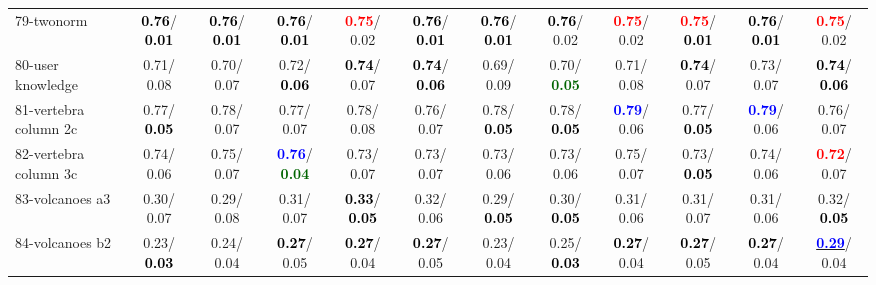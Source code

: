 \begin{table}[h]
\begin{center}
{\begin{tabular}{lc|c|c|c|c|c|c|c|c|c|c}
79-twonorm & \textcolor{black}{\textbf{  0.76}}/\textcolor{black}{\textbf{  0.01}} & \textcolor{black}{\textbf{  0.76}}/\textcolor{black}{\textbf{  0.01}} & \textcolor{black}{\textbf{  0.76}}/\textcolor{black}{\textbf{  0.01}} & \textcolor{red}{\textbf{  0.75}}/  0.02 & \textcolor{black}{\textbf{  0.76}}/\textcolor{black}{\textbf{  0.01}} & \textcolor{black}{\textbf{  0.76}}/\textcolor{black}{\textbf{  0.01}} & \textcolor{black}{\textbf{  0.76}}/  0.02 & \textcolor{red}{\textbf{  0.75}}/  0.02 & \textcolor{red}{\textbf{  0.75}}/\textcolor{black}{\textbf{  0.01}} & \textcolor{black}{\textbf{  0.76}}/\textcolor{black}{\textbf{  0.01}} & \textcolor{red}{\textbf{  0.75}}/  0.02 \\
80-user knowledge &   0.71/  0.08 &   0.70/  0.07 &   0.72/\textcolor{black}{\textbf{  0.06}} & \textcolor{black}{\textbf{  0.74}}/  0.07 & \textcolor{black}{\textbf{  0.74}}/\textcolor{black}{\textbf{  0.06}} &   0.69/  0.09 &   0.70/\textcolor{darkgreen}{\textbf{  0.05}} &   0.71/  0.08 & \textcolor{black}{\textbf{  0.74}}/  0.07 &   0.73/  0.07 & \textcolor{black}{\textbf{  0.74}}/\textcolor{black}{\textbf{  0.06}} \\
81-vertebra column 2c &   0.77/\textcolor{black}{\textbf{  0.05}} &   0.78/  0.07 &   0.77/  0.07 &   0.78/  0.08 &   0.76/  0.07 &   0.78/\textcolor{black}{\textbf{  0.05}} &   0.78/\textcolor{black}{\textbf{  0.05}} & \textcolor{blue}{\textbf{  0.79}}/  0.06 &   0.77/\textcolor{black}{\textbf{  0.05}} & \textcolor{blue}{\textbf{  0.79}}/  0.06 &   0.76/  0.07 \\
82-vertebra column 3c &   0.74/  0.06 &   0.75/  0.07 & \textcolor{blue}{\textbf{  0.76}}/\textcolor{darkgreen}{\textbf{  0.04}} &   0.73/  0.07 &   0.73/  0.07 &   0.73/  0.06 &   0.73/  0.06 &   0.75/  0.07 &   0.73/\textcolor{black}{\textbf{  0.05}} &   0.74/  0.06 & \textcolor{red}{\textbf{  0.72}}/  0.07 \\
83-volcanoes a3 &   0.30/  0.07 &   0.29/  0.08 &   0.31/  0.07 & \textcolor{black}{\textbf{  0.33}}/\textcolor{black}{\textbf{  0.05}} &   0.32/  0.06 &   0.29/\textcolor{black}{\textbf{  0.05}} &   0.30/\textcolor{black}{\textbf{  0.05}} &   0.31/  0.06 &   0.31/  0.07 &   0.31/  0.06 &   0.32/\textcolor{black}{\textbf{  0.05}} \\
84-volcanoes b2 &   0.23/\textcolor{black}{\textbf{  0.03}} &   0.24/  0.04 & \textcolor{black}{\textbf{  0.27}}/  0.05 & \textcolor{black}{\textbf{  0.27}}/  0.04 & \textcolor{black}{\textbf{  0.27}}/  0.05 &   0.23/  0.04 &   0.25/\textcolor{black}{\textbf{  0.03}} & \textcolor{black}{\textbf{  0.27}}/  0.04 & \textcolor{black}{\textbf{  0.27}}/  0.05 & \textcolor{black}{\textbf{  0.27}}/  0.04 & \underline{\textcolor{blue}{\textbf{  0.29}}}/  0.04 \\

\end{tabular}}
\end{center}
\end{table}

